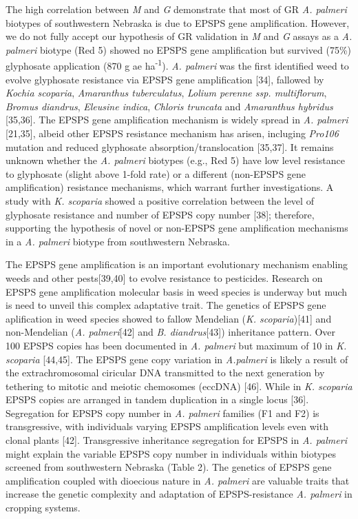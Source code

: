 \documentclass[10pt,letterpaper]{article}
\begin{document}
The high correlation between \emph{M} and \emph{G} demonstrate that most
of GR \emph{A. palmeri} biotypes of southwestern Nebraska is due to
EPSPS gene amplification. However, we do not fully accept our hypothesis
of GR validation in \emph{M} and \emph{G} assays as a \emph{A. palmeri}
biotype (Red 5) showed no EPSPS gene amplification but survived (75\%)
glyphosate application (870 g ae ha\textsuperscript{-1}). \emph{A.
palmeri} was the first identified weed to evolve glyphosate resistance
via EPSPS gene amplification {[}34{]}, fallowed by \emph{Kochia
scoparia}, \emph{Amaranthus tuberculatus}, \emph{Lolium perenne ssp.
multiflorum}, \emph{Bromus diandrus}, \emph{Eleusine indica},
\emph{Chloris truncata} and \emph{Amaranthus hybridus} {[}35,36{]}. The
EPSPS gene amplification mechanism is widely spread in \emph{A. palmeri}
{[}21,35{]}, albeid other EPSPS resistance mechanism has arisen,
incluging \emph{Pro106} mutation and reduced glyphosate
absorption/translocation {[}35,37{]}. It remains unknown whether the
\emph{A. palmeri} biotypes (e.g., Red 5) have low level resistance to
glyphosate (slight above 1-fold rate) or a different (non-EPSPS gene
amplification) resistance mechanisms, which warrant further
investigations. A study with \emph{K. scoparia} showed a positive
correlation between the level of glyphosate resistance and number of
EPSPS copy number {[}38{]}; therefore, supporting the hypothesis of
novel or non-EPSPS gene amplification mechanisms in a \emph{A. palmeri}
biotype from southwestern Nebraska.

The EPSPS gene amplification is an important evolutionary mechanism
enabling weeds and other pests{[}39,40{]} to evolve resistance to
pesticides. Research on EPSPS gene amplification molecular basis in weed
species is underway but much is need to unveil this complex adaptative
trait. The genetics of EPSPS gene aplification in weed species showed to
fallow Mendelian (\emph{K. scoparia}){[}41{]} and non-Mendelian
(\emph{A. palmeri}{[}42{]} and \emph{B. diandrus}{[}43{]}) inheritance
pattern. Over 100 EPSPS copies has been documented in \emph{A. palmeri}
but maximum of 10 in \emph{K. scoparia} {[}44,45{]}. The EPSPS gene copy
variation in \emph{A.palmeri} is likely a result of the extrachromosomal
ciricular DNA transmitted to the next generation by tethering to mitotic
and meiotic chemosomes (eccDNA) {[}46{]}. While in \emph{K. scoparia}
EPSPS copies are arranged in tandem duplication in a single locus
{[}36{]}. Segregation for EPSPS copy number in \emph{A. palmeri}
families (F1 and F2) is transgressive, with individuals varying EPSPS
amplification levels even with clonal plants {[}42{]}. Transgressive
inheritance segregation for EPSPS in \emph{A. palmeri} might explain the
variable EPSPS copy number in individuals within biotypes screened from
southwestern Nebraska (Table 2). The genetics of EPSPS gene
amplification coupled with dioecious nature in \emph{A. palmeri} are
valuable traits that increase the genetic complexity and adaptation of
EPSPS-resistance \emph{A. palmeri} in cropping systems.
\end{document}
